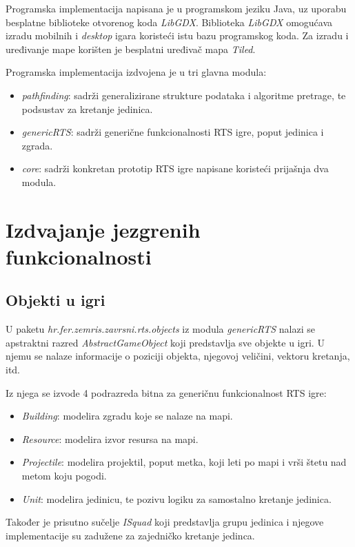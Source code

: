 \documentclass[times, utf8, zavrsni, numeric]{fer}
\begin{document}
\par Programska implementacija napisana je u programskom jeziku Java, uz uporabu besplatne biblioteke otvorenog koda \textit{LibGDX}.
Biblioteka \textit{LibGDX} omogućava izradu mobilnih i \textit{desktop} igara koristeći istu bazu programskog koda. 
Za izradu i uređivanje mape korišten je besplatni uređivač mapa \textit{Tiled}.

\par Programska implementacija izdvojena je u tri glavna modula:
\begin{itemize}
	\item \textit{pathfinding}: sadrži generalizirane strukture podataka i algoritme pretrage, te podsustav za kretanje jedinica.
	\item \textit{genericRTS}: sadrži generične funkcionalnosti RTS igre, poput jedinica i zgrada.
	\item \textit{core}: sadrži konkretan prototip RTS igre napisane koristeći prijašnja dva modula.
\end{itemize}

\section{Izdvajanje jezgrenih funkcionalnosti}\label{sec:core}

\subsection{Objekti u igri}

\par U paketu \textit{hr.fer.zemris.zavrsni.rts.objects} iz modula \textit{genericRTS} nalazi se apstraktni razred \textit{AbstractGameObject} koji predstavlja sve objekte u igri.
U njemu se nalaze informacije o poziciji objekta, njegovoj veličini, vektoru kretanja, itd.

\par Iz njega se izvode 4 podrazreda bitna za generičnu funkcionalnost RTS igre:
\begin{itemize}
	\item \textit{Building}: modelira zgradu koje se nalaze na mapi.
	\item \textit{Resource}: modelira izvor resursa na mapi.
	\item \textit{Projectile}: modelira projektil, poput metka, koji leti po mapi i vrši štetu nad metom koju pogodi.
	\item \textit{Unit}: modelira jedinicu, te pozivu logiku za samostalno kretanje jedinica. 
\end{itemize}
Također je prisutno sučelje \textit{ISquad} koji predstavlja grupu jedinica i njegove implementacije su zadužene za zajedničko kretanje jedinca.
\end{document}
